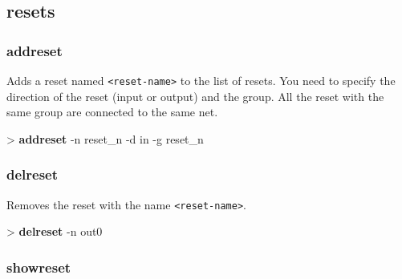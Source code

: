 \documentclass[10pt,a4paper]{article}
\begin{document}
\subsection{resets}
\subsubsection{addreset}
\label{subsec:addreset}

Adds a reset named \texttt{<reset-name>} to the list of resets. You need to specify the direction of the reset (input or output) and the group. All the reset with the same group are connected to the same net.\\


\begin{sampletitle}
> \textbf{\tool{} addreset} -n reset\_n -d in -g reset\_n
\end{sampletitle}


\subsubsection{delreset}
\label{subsec:delreset}

Removes the reset with the name \texttt{<reset-name>}.\\


\begin{sampletitle}
> \textbf{\tool{} delreset} -n out0
\end{sampletitle}


\subsubsection{showreset}
\label{subsec:showreset}
\end{document}
